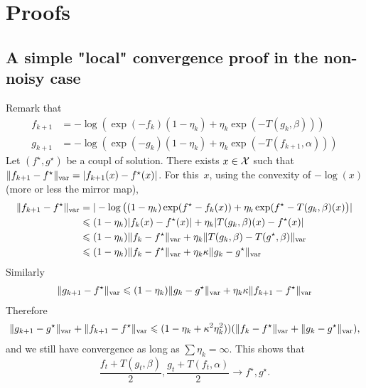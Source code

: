\documentclass[a4paper, 10pt]{article}
\begin{document}
\section{Proofs}

\subsection{A simple "local" convergence proof in the non-noisy case}
Remark that 
\begin{align}
    f_{k+1} &=  - \log (\exp(-f_k) (1 - \eta_k) + \eta_k \exp(-T(g_k, \beta))) \\ 
    g_{k+1} &=  - \log (\exp(-g_k) (1 - \eta_k) + \eta_k \exp(-T(f_{k+1}, \alpha)))
\end{align}
Let $(f^\star, g^\star)$ be a coupl of solution. There exists $x \in \mathcal{X}$ such that $\Vert
f_{k+1} - f^\star \Vert_{\text{var}} = |f_{k+1}(x) - f^\star(x)|$. For this~$x$, using
the convexity of $- \log(x)$ (more or less the mirror map),
\begin{align}
    \Vert f_{k+1} - f^\star \Vert_{\text{var}}
    &=
     |- \log\big((1 - \eta_k) \exp(f^\star -f_k(x)) 
     + \eta_k \exp(f^\star-T(g_k, \beta)(x)\big) |  \\
    &\leqslant (1 - \eta_k) | f_k(x) - f^\star(x)| + \eta_k | T(g_k,\beta)(x) - f^\star(x)| \\
    &\leqslant (1 - \eta_k) \Vert f_k - f^\star \Vert_{\text{var}} + \eta_k
    \Vert T(g_k,\beta) - T(g^\star, \beta) \Vert_{\text{var}} \\
    &\leqslant (1 - \eta_k) \Vert f_k - f^\star \Vert_{\text{var}}
     + \eta_k \kappa \Vert g_k - g^\star \Vert_{\text{var}}
\end{align}
Similarly
\begin{align}
    \Vert g_{k+1} - f^\star \Vert_{\text{var}} \leqslant
    (1 - \eta_k) \Vert g_k - g^\star \Vert_{\text{var}} +
     \eta_k \kappa \Vert f_{k+1} - f^\star \Vert_{\text{var}}
\end{align}
Therefore
\begin{align}
    \Vert g_{k+1} - g^\star \Vert_{\text{var}} + \Vert f_{k+1} - f^\star \Vert_{\text{var}} \leqslant
    (1 - \eta_k + \kappa^2 \eta_k^2)) ( \Vert f_k - f^\star \Vert_{\text{var}} 
     + \Vert g_k - g^\star \Vert_{\text{var}} ),
\end{align}
and we still have convergence as long as $\sum \eta_k = \infty$. This shows that
\begin{equation}
\frac{f_t + T(g_t,\beta)}{2},
\frac{g_t + T(f_t, \alpha)}{2} \to f^\star, g^\star.
\end{equation}
\end{document}
